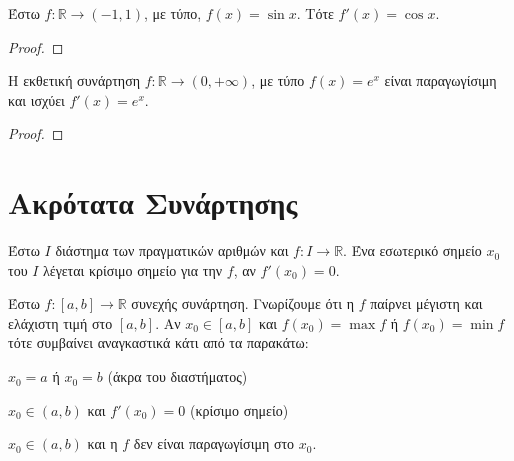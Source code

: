 \documentclass[main.tex]{subfiles}
\begin{document}
            \begin{prop}
                Έστω $ f \colon \mathbb{R} \to (-1,1)$, με τύπο, $ f(x) = \sin{x} $. Τότε 
                $ f'(x) = \cos{x} $.
            \end{prop}

            \begin{proof}

            \end{proof}

            \begin{prop}
                Η εκθετική συνάρτηση $ f \colon \mathbb{R} \to (0,+ \infty) $, με τύπο 
                $ f(x) = e^{x} $ είναι παραγωγίσιμη και ισχύει $ f'(x) = e^{x} $.
            \end{prop}

            \begin{proof}

            \end{proof}

            \section{Ακρότατα Συνάρτησης}

            \begin{dfn}
                Έστω $I$ διάστημα των πραγματικών αριθμών και $ f \colon I \to \mathbb{R} $. 
                Ένα εσωτερικό σημείο $ x_{0} $ του $I$ λέγεται κρίσιμο σημείο για την $f$, αν 
                $ f'(x_{0} ) = 0 $.
            \end{dfn}

            \begin{rem}
                Έστω $ f \colon [a,b] \to \mathbb{R} $ συνεχής συνάρτηση. Γνωρίζουμε ότι η $f$ 
                παίρνει μέγιστη και ελάχιστη τιμή στο $ [a,b] $. Αν $ x_{0} \in [a,b] $ και 
                $ f(x_{0}) = \max f $ ή $ f(x_{0}) = \min f $ τότε συμβαίνει αναγκαστικά 
                κάτι από τα παρακάτω:
                \begin{myitemize}
                \item $ x_{0} = a $ ή $ x_{0} =b $ (άκρα του διαστήματος)
                \item $ x_{0} \in (a,b) $ και $ f'(x_{0} ) = 0 $ (κρίσιμο σημείο)
                \item $ x_{0} \in (a,b) $ και η $f$ δεν είναι παραγωγίσιμη στο $ x_{0} $.
                \end{myitemize}
            \end{rem}
\end{document}
